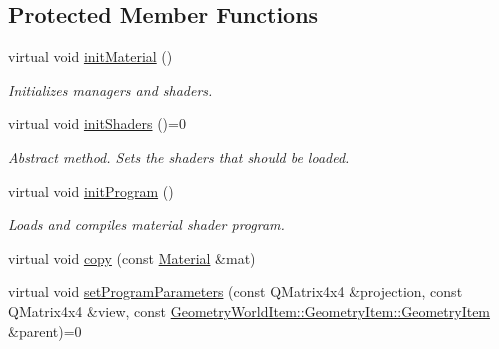 \subsection*{Protected Member Functions}
\begin{DoxyCompactItemize}
\item 
\mbox{\label{class_geometry_engine_1_1_geometry_material_1_1_material_a31bb308f53741c015066ee112b497fcd}} 
virtual void \mbox{\hyperlink{class_geometry_engine_1_1_geometry_material_1_1_material_a31bb308f53741c015066ee112b497fcd}{init\+Material}} ()
\begin{DoxyCompactList}\small\item\em Initializes managers and shaders. \end{DoxyCompactList}\item 
\mbox{\label{class_geometry_engine_1_1_geometry_material_1_1_material_a06a1c603599a2c2b5488e6fdcbce00eb}} 
virtual void \mbox{\hyperlink{class_geometry_engine_1_1_geometry_material_1_1_material_a06a1c603599a2c2b5488e6fdcbce00eb}{init\+Shaders}} ()=0
\begin{DoxyCompactList}\small\item\em Abstract method. Sets the shaders that should be loaded. \end{DoxyCompactList}\item 
\mbox{\label{class_geometry_engine_1_1_geometry_material_1_1_material_a86cda85f55e61b5d66910e94ec4b1ff6}} 
virtual void \mbox{\hyperlink{class_geometry_engine_1_1_geometry_material_1_1_material_a86cda85f55e61b5d66910e94ec4b1ff6}{init\+Program}} ()
\begin{DoxyCompactList}\small\item\em Loads and compiles material shader program. \end{DoxyCompactList}\item 
virtual void \mbox{\hyperlink{class_geometry_engine_1_1_geometry_material_1_1_material_a632cdbe72ea955bc591a3902f63b6061}{copy}} (const \mbox{\hyperlink{class_geometry_engine_1_1_geometry_material_1_1_material}{Material}} \&mat)
\item 
virtual void \mbox{\hyperlink{class_geometry_engine_1_1_geometry_material_1_1_material_a68310797df53062f237d0005fbcfce7e}{set\+Program\+Parameters}} (const Q\+Matrix4x4 \&projection, const Q\+Matrix4x4 \&view, const \mbox{\hyperlink{class_geometry_engine_1_1_geometry_world_item_1_1_geometry_item_1_1_geometry_item}{Geometry\+World\+Item\+::\+Geometry\+Item\+::\+Geometry\+Item}} \&parent)=0

\end{DoxyCompactItemize}
